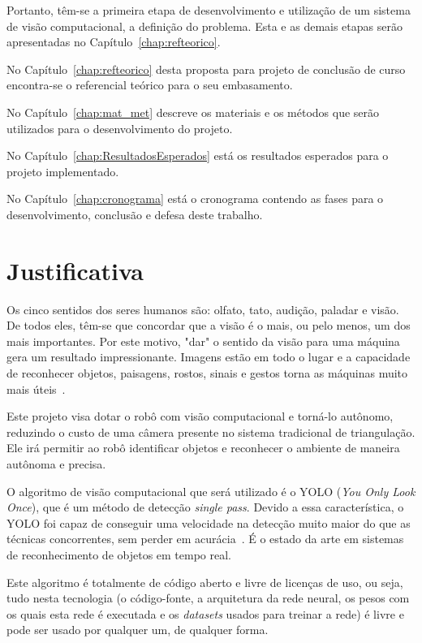 Portanto, têm-se a primeira etapa de desenvolvimento e utilização de um sistema de visão computacional, a definição do problema. Esta e as demais etapas serão apresentadas no Capítulo~\ref{chap:refteorico}.

No Capítulo~\ref{chap:refteorico} desta proposta para projeto de conclusão de curso encontra-se o referencial teórico para o seu embasamento.

No Capítulo~\ref{chap:mat_met} descreve os materiais e os métodos que serão utilizados para o desenvolvimento do projeto.

No Capítulo~\ref{chap:ResultadosEsperados} está os resultados esperados para o projeto implementado.

No Capítulo~\ref{chap:cronograma} está o cronograma contendo as fases para o desenvolvimento, conclusão e defesa deste trabalho.

\section{Justificativa}
\label{sec:justi}

Os cinco sentidos dos seres humanos são: olfato, tato, audição, paladar e visão. De todos eles, têm-se que concordar que a visão é o mais, ou pelo menos, um dos mais importantes. Por este motivo, "dar" o sentido da visão para uma máquina gera um resultado impressionante. Imagens estão em todo o lugar e a capacidade de reconhecer objetos, paisagens, rostos, sinais e gestos torna as máquinas muito mais úteis~\cite{antonello2014introduccao}.

Este projeto visa dotar o robô com visão computacional e torná-lo autônomo, reduzindo o custo de uma câmera presente no sistema tradicional de triangulação. Ele irá permitir ao robô identificar objetos e reconhecer o ambiente de maneira autônoma e precisa.

O algoritmo de visão computacional que será utilizado é o YOLO (\textit{You Only Look Once}), que é um método de detecção \textit{single pass}. Devido a essa característica, o YOLO foi capaz de conseguir uma velocidade na detecção muito maior do que as técnicas concorrentes, sem perder em acurácia~\cite{alvesGabriel2020}. É o estado da arte em sistemas de reconhecimento de objetos em tempo real.

Este algoritmo é totalmente de código aberto e livre de licenças de uso, ou seja, tudo nesta tecnologia (o código-fonte, a arquitetura da rede neural, os pesos com os quais esta rede é executada e os \textit{datasets} usados para treinar a rede) é livre e pode ser usado por qualquer um, de qualquer forma.

